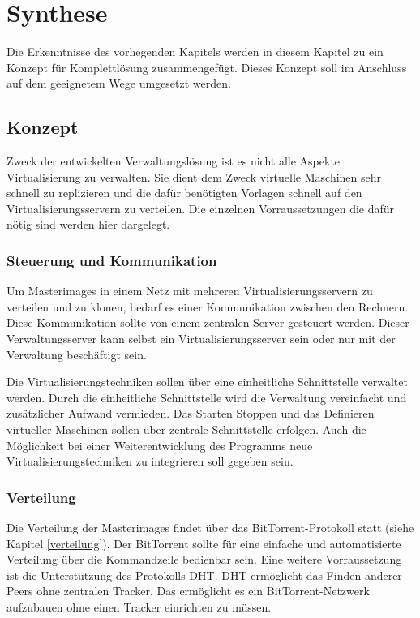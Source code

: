 \chapter{Synthese}
Die Erkenntnisse des vorhegenden Kapitels werden in diesem Kapitel zu ein Konzept für Komplettlösung zusammengefügt. Dieses Konzept soll im Anschluss auf dem geeignetem Wege umgesetzt werden.
\section{Konzept}
Zweck der entwickelten Verwaltungslösung ist es nicht alle Aspekte Virtualisierung zu verwalten. Sie dient dem Zweck virtuelle Maschinen sehr schnell zu replizieren und die dafür benötigten Vorlagen schnell auf den Virtualisierungsservern zu verteilen. Die einzelnen Vorraussetzungen die dafür nötig sind werden hier dargelegt.

\subsection{Steuerung und Kommunikation}
Um Masterimages in einem Netz mit mehreren Virtualisierungsservern zu verteilen und zu klonen, bedarf es einer Kommunikation zwischen den Rechnern. Diese Kommunikation sollte von einem zentralen Server gesteuert werden. Dieser Verwaltungsserver kann selbst ein Virtualisierungsserver sein oder nur mit der Verwaltung beschäftigt sein.

Die Virtualisierungstechniken sollen über eine einheitliche Schnittstelle verwaltet werden. Durch die einheitliche Schnittstelle wird die Verwaltung vereinfacht und zusätzlicher Aufwand vermieden. Das Starten Stoppen und das Definieren virtueller Maschinen sollen über zentrale Schnittstelle erfolgen. Auch die Möglichkeit bei einer Weiterentwicklung des Programms neue Virtualisierungstechniken zu integrieren soll gegeben sein.

\subsection{Verteilung}
Die Verteilung der Masterimages findet über das BitTorrent-Protokoll statt (siehe Kapitel \ref{verteilung}). Der BitTorrent sollte für eine einfache und automatisierte Verteilung über die Kommandzeile bedienbar sein. Eine weitere Vorraussetzung ist die Unterstützung des Protokolls DHT. DHT ermöglicht das Finden anderer Peers ohne zentralen Tracker. Das ermöglicht es ein BitTorrent-Netzwerk aufzubauen ohne einen Tracker einrichten zu müssen.

